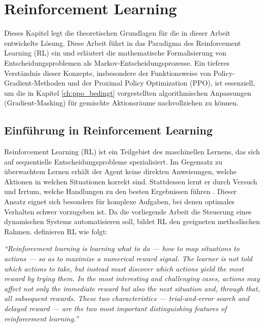 \chapter{Reinforcement Learning}
\label{ch:rl_grundlagen}

Dieses Kapitel legt die theoretischen Grundlagen für die in dieser Arbeit entwickelte Lösung. Diese Arbeit führt in das Paradigma des Reinforcement Learning (\ac{RL}) ein und erläutert die mathematische Formalisierung von Entscheidungsproblemen als Markov-Entscheidungsprozesse. Ein tieferes Verständnis dieser Konzepte, insbesondere der Funktionsweise von Policy\hyp{}Gradient\hyp{}Methoden und der Proximal Policy Optimization (\ac{PPO}), ist essenziell, um die in Kapitel \ref{ch:ppo_bedingt} vorgestellten algorithmischen Anpassungen (Gradient\hyp{}Masking) für gemischte Aktionsräume nachvollziehen zu können.

\section{Einführung in Reinforcement Learning}

Reinforcement Learning (\ac{RL}) ist ein Teilgebiet des maschinellen Lernens, das sich auf sequentielle Entscheidungsprobleme spezialisiert. Im Gegensatz zu überwachtem Lernen erhält der Agent keine direkten Anweisungen, welche Aktionen in welchen Situationen korrekt sind. Stattdessen lernt er durch Versuch und Irrtum, welche Handlungen zu den besten Ergebnissen führen \cite[Kap. 1]{sutton2018rl}. Dieser Ansatz eignet sich besonders für komplexe Aufgaben, bei denen optimales Verhalten schwer vorzugeben ist. Da die vorliegende Arbeit die Steuerung eines dynamischen Systems automatisieren soll, bildet \ac{RL} den geeigneten methodischen Rahmen. \citeauthor{sutton2018rl} definieren \ac{RL} wie folgt:
\medskip

\textit{\enquote{Reinforcement learning is learning what to do — how to map situations to actions — so as to maximize a numerical reward signal. The learner is not told which actions to take, but instead must discover which actions yield the most reward by trying them. In the most interesting and challenging cases, actions may affect not only the immediate reward but also the next situation and, through that, all subsequent rewards. These two characteristics — trial-and-error search and delayed reward — are the two most important distinguishing features of reinforcement learning.} \cite[Kap. 1.1]{sutton2018rl}}
\medskip

